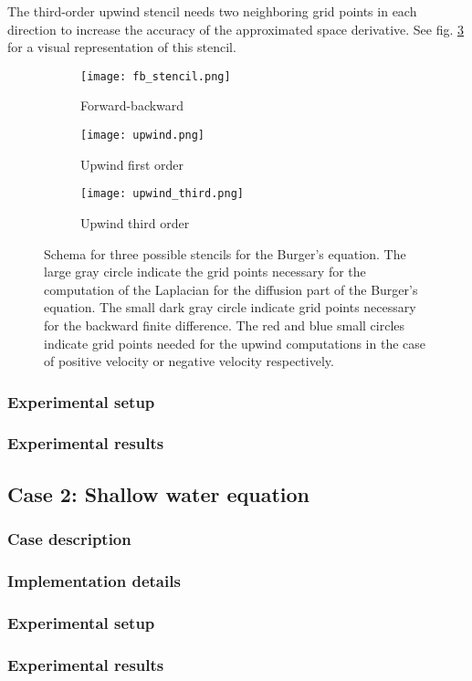 The third-order upwind stencil needs two neighboring grid points in each direction to increase the accuracy of the approximated space derivative.
See fig. \ref{fig:upwind_third_stencil} for a visual representation of this stencil.

\begin{figure}[!htbp]
\centering
\begin{subfigure}{.3\textwidth}
  \centering
  \texttt{[image: fb\_stencil.png]}
  \caption{Forward-backward}
  \label{fig:fb_stencil}
\end{subfigure}%
\begin{subfigure}{.3\textwidth}
  \centering
  \texttt{[image: upwind.png]}
  \caption{Upwind first order}
  \label{fig:upwind_stencil}
\end{subfigure}
\begin{subfigure}{.3\textwidth}
  \centering
  \texttt{[image: upwind\_third.png]}
  \caption{Upwind third order}
  \label{fig:upwind_third_stencil}
\end{subfigure}
\caption{Schema for three possible stencils for the Burger's equation. The large gray circle indicate the grid points necessary for the computation of the Laplacian for the diffusion part of the Burger's equation. The small dark gray circle indicate grid points necessary for the backward finite difference. The red and blue small circles indicate grid points needed for the upwind computations in the case of positive velocity or negative velocity respectively.}
\label{fig:burger_stencils}
\end{figure}


\subsubsection{Experimental setup}

\subsubsection{Experimental results}


\subsection{Case 2: Shallow water equation}

\subsubsection{Case description}

\subsubsection{Implementation details}

\subsubsection{Experimental setup}

\subsubsection{Experimental results}
